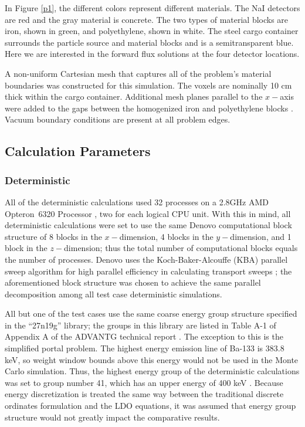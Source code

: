 In Figure \ref{p1}, the different colors represent different materials. The NaI 
detectors are red and the gray material is concrete. The two types of material blocks
are iron, shown in green, and polyethylene, shown in white. The steel cargo container
surrounds the particle source and material blocks and is a semitransparent blue. Here
we are interested in the forward flux solutions at the four detector locations.

A non-uniform Cartesian mesh that captures all of the problem's material boundaries
was constructed for this simulation. The voxels are nominally 10 cm thick within the
cargo container. Additional mesh planes parallel to the $x-$axis were added to the 
gaps between the homogenized iron and polyethylene blocks \cite{advantg}. Vacuum
boundary conditions are present at all problem edges.

\subsection{Calculation Parameters}
\subsubsection{Deterministic}
\label{params}

All of the deterministic calculations used 32 processes on a 2.8GHz AMD 
Opteron\texttrademark\ 6320 Processor \cite{amd}, two for each logical CPU unit. 
With this in mind, all deterministic calculations were set to use the same Denovo 
computational block structure of 8 blocks 
in the $x-$dimension, 4 blocks in the $y-$dimension, and 1 block in the $z-$dimension;
thus the total number of computational blocks equals the number of processes.
Denovo uses the Koch-Baker-Alcouffe (KBA) parallel sweep algorithm for high
parallel efficiency in calculating transport sweeps \cite{denovo}; the aforementioned
block structure was chosen to achieve the same parallel decomposition among all test 
case deterministic simulations. 

All but one of the test cases use the same coarse energy group structure specified in 
the ``27n19g'' library; the groups in this library are listed in Table A-1 of 
Appendix A of the ADVANTG technical report \cite{advantg}. The exception to this is 
the simplified portal problem. The highest energy emission line of Ba-133 is 383.8 
keV, so weight window bounds above this energy would not be used in the Monte Carlo 
simulation. Thus, the highest energy group of the deterministic calculations was set 
to group number 41, which has an upper energy of 400 keV \cite{advantg}. Because 
energy discretization is treated the same way between the traditional discrete 
ordinates formulation and the LDO equations, it was assumed that energy group 
structure would not greatly impact the comparative results.

